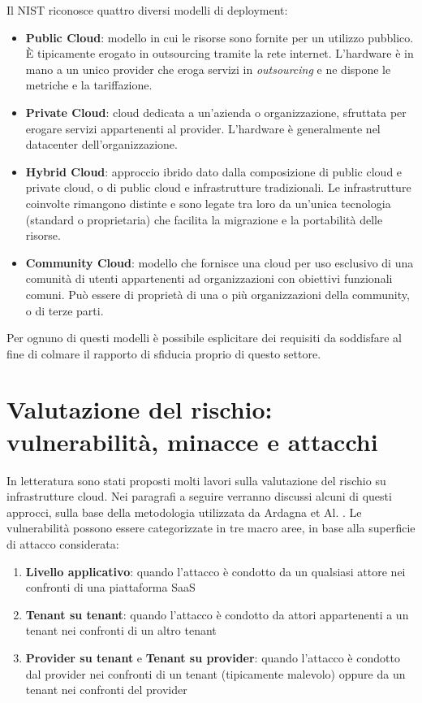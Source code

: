 \documentclass[../main.tex]{subfiles}
\begin{document}
Il NIST \cite{NISTCloud} riconosce quattro diversi modelli di deployment:
\begin{itemize}
    \item \textbf{Public Cloud}: modello in cui le risorse sono fornite per un utilizzo pubblico. È tipicamente erogato in outsourcing tramite la rete internet. L'hardware è in mano a un unico provider che eroga servizi in \textit{outsourcing} e ne dispone le metriche e la tariffazione.
    \item \textbf{Private Cloud}: cloud dedicata a un'azienda o organizzazione, sfruttata per erogare servizi appartenenti al provider. L'hardware è generalmente nel datacenter dell'organizzazione.
    \item \textbf{Hybrid Cloud}: approccio ibrido dato dalla composizione di public cloud e private cloud, o di public cloud e infrastrutture tradizionali. Le infrastrutture coinvolte rimangono distinte e sono legate tra loro da un'unica tecnologia (standard o proprietaria) che facilita la migrazione e la portabilità delle risorse.
    \item \textbf{Community Cloud}: modello che fornisce una cloud per uso esclusivo di una comunità di utenti appartenenti ad organizzazioni con obiettivi funzionali comuni. Può essere di proprietà di una o più organizzazioni della community, o di terze parti.
\end{itemize}
Per ognuno di questi modelli è possibile esplicitare dei requisiti da soddisfare al fine di colmare il rapporto di sfiducia proprio di questo settore\cite{Ardagna:2015:SAC:2808687.2767005}.

\section{Valutazione del rischio: vulnerabilità, minacce e attacchi}
In letteratura sono stati proposti molti lavori sulla valutazione del rischio su infrastrutture cloud. Nei paragrafi a seguire verranno discussi alcuni di questi approcci, sulla base della metodologia utilizzata da Ardagna et Al. \cite{Ardagna:2015:SAC:2808687.2767005}.
Le vulnerabilità possono essere categorizzate in tre macro aree, in base alla superficie di attacco considerata:
\begin{enumerate}
    \item \textbf{Livello applicativo}: quando l'attacco è condotto da un qualsiasi attore nei confronti di una piattaforma SaaS
    \item \textbf{Tenant su tenant}: quando l'attacco è condotto da attori appartenenti a un tenant nei confronti di un altro tenant
    \item \textbf{Provider su tenant} e \textbf{Tenant su provider}: quando l'attacco è condotto dal provider nei confronti di un tenant (tipicamente malevolo) oppure da un tenant nei confronti del provider 
\end{enumerate}
\end{document}
